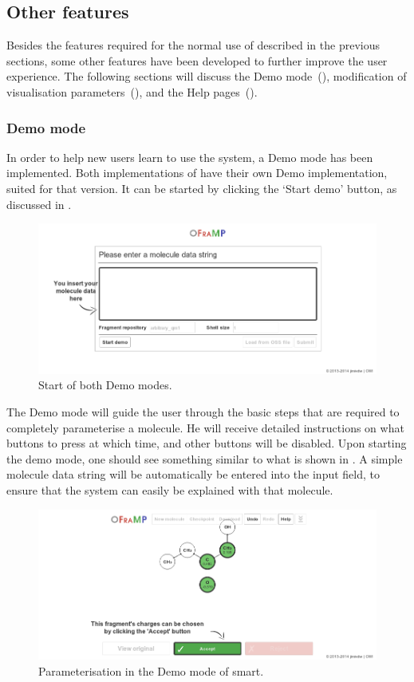 \subsection{Other features}
Besides the features required for the normal use of \oframp{} described in the previous sections, some other features have been developed to further improve the user experience. The following sections will discuss the Demo mode~(), modification of visualisation parameters~(), and the \oframp{} Help pages~().

\subsubsection{Demo mode}

In order to help new users learn to use the system, a Demo mode has been implemented. Both implementations of \oframp{} have their own Demo implementation, suited for that version. It can be started by clicking the `Start demo' button, as discussed in .

\begin{figure}
\center
\includegraphics[width=.9\textwidth]{img/demo_1.png}
\caption{Start of both Demo modes.}
\end{figure}

The Demo mode will guide the user through the basic steps that are required to completely parameterise a molecule. He will receive detailed instructions on what buttons to press at which time, and other buttons will be disabled. Upon starting the demo mode, one should see something similar to what is shown in . A simple molecule data string will be automatically be entered into the input field, to ensure that the system can easily be explained with that molecule.

\begin{figure}
\center
\includegraphics[width=.9\textwidth]{img/demo_2.png}
\caption{Parameterisation in the Demo mode of \oframp{} smart.}
\end{figure}

